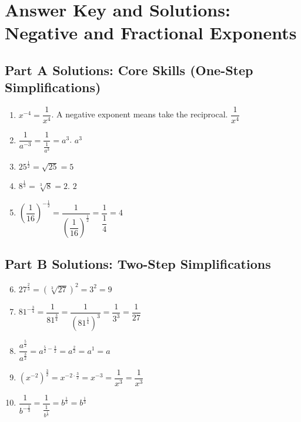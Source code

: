 \documentclass[12pt]{article}
\begin{document}
\newpage


\section*{Answer Key and Solutions: Negative and Fractional Exponents}

\subsection*{Part A Solutions: Core Skills (One-Step Simplifications)}
\begin{enumerate}
  \item \(x^{-4} = \dfrac{1}{x^4}\). A negative exponent means take the reciprocal. \(\boxed{\dfrac{1}{x^4}}\)

  \item \(\dfrac{1}{a^{-3}} = \dfrac{1}{\frac{1}{a^3}} = a^3\). \(\boxed{a^3}\)

  \item \(25^{\frac{1}{2}} = \sqrt{25} = \boxed{5}\)

  \item \(8^{\frac{1}{3}} = \sqrt[3]{8} = 2\). \(\boxed{2}\)

  \item \(\left(\dfrac{1}{16}\right)^{-\frac{1}{2}} = \dfrac{1}{\left(\dfrac{1}{16}\right)^{\frac{1}{2}}}
  = \dfrac{1}{\dfrac{1}{4}} = \boxed{4}\)
\end{enumerate}

\subsection*{Part B Solutions: Two-Step Simplifications}
\begin{enumerate}
  \setcounter{enumi}{5}
  \item \(27^{\frac{2}{3}} = \left(\sqrt[3]{27}\right)^2 = 3^2 = \boxed{9}\)

  \item \(81^{-\frac{3}{4}} = \dfrac{1}{81^{\frac{3}{4}}}
  = \dfrac{1}{\left(81^{\frac{1}{4}}\right)^3}
  = \dfrac{1}{3^3}
  = \boxed{\dfrac{1}{27}}\)

  \item \(\dfrac{a^{\frac{5}{2}}}{a^{\frac{3}{2}}}
  = a^{\frac{5}{2} - \frac{3}{2}}
  = a^{\frac{2}{2}}
  = a^1
  = \boxed{a}\)

  \item \((x^{-2})^{\frac{3}{2}}
  = x^{-2 \cdot \frac{3}{2}}
  = x^{-3}
  = \dfrac{1}{x^3}
  = \boxed{\dfrac{1}{x^3}}\)

  \item \(\dfrac{1}{b^{-\frac{1}{3}}}
  = \dfrac{1}{\frac{1}{b^{\frac{1}{3}}}}
  = b^{\frac{1}{3}}
  = \boxed{b^{\frac{1}{3}}}\)
\end{enumerate}
\end{document}
